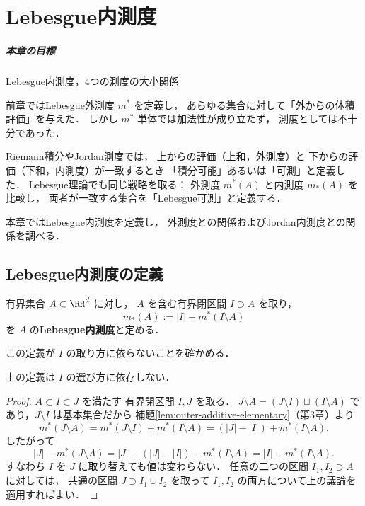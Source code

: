 \setcounter{chapter}{3}
\chapter{Lebesgue内測度}\label{chap:lebesgue-inner}

\paragraph{本章の目標}
Lebesgue内測度，4つの測度の大小関係

前章ではLebesgue外測度 $m^*$ を定義し，
あらゆる集合に対して「外からの体積評価」を与えた．
しかし $m^*$ 単体では加法性が成り立たず，
測度としては不十分であった．

Riemann積分やJordan測度では，
上からの評価（上和，外測度）と
下からの評価（下和，内測度）が一致するとき
「積分可能」あるいは「可測」と定義した．
Lebesgue理論でも同じ戦略を取る：
外測度 $m^*(A)$ と内測度 $m_*(A)$ を比較し，
両者が一致する集合を「Lebesgue可測」と定義する．

本章ではLebesgue内測度を定義し，
外測度との関係およびJordan内測度との関係を調べる．

\section{Lebesgue内測度の定義}\label{sec:lebesgue-inner-def}

\begin{definition}[Lebesgue内測度]\label{def:lebesgue-inner-measure}
有界集合 $A \subset \RR^d$ に対し，
$A$ を含む有界閉区間 $I \supset A$ を取り，
\[
m_*(A) := |I| - m^*(I \setminus A)
\]
を $A$ の\textbf{Lebesgue内測度}と定める．
\end{definition}

この定義が $I$ の取り方に依らないことを確かめる．

\begin{proposition}\label{prop:inner-well-defined}
上の定義は $I$ の選び方に依存しない．
\end{proposition}
\begin{proof}
$A \subset I \subset J$ を満たす
有界閉区間 $I, J$ を取る．
$J \setminus A = (J \setminus I) \sqcup (I \setminus A)$
であり，$J \setminus I$ は基本集合だから
補題\ref{lem:outer-additive-elementary}（第3章）より
\[
m^*(J \setminus A)
= m^*(J \setminus I) + m^*(I \setminus A)
= (|J| - |I|) + m^*(I \setminus A).
\]
したがって
\[
|J| - m^*(J \setminus A)
= |J| - (|J| - |I|) - m^*(I \setminus A)
= |I| - m^*(I \setminus A).
\]
すなわち $I$ を $J$ に取り替えても値は変わらない．
任意の二つの区間 $I_1, I_2 \supset A$ に対しては，
共通の区間 $J \supset I_1 \cup I_2$ を取って
$I_1, I_2$ の両方について上の議論を適用すればよい．
\end{proof}

